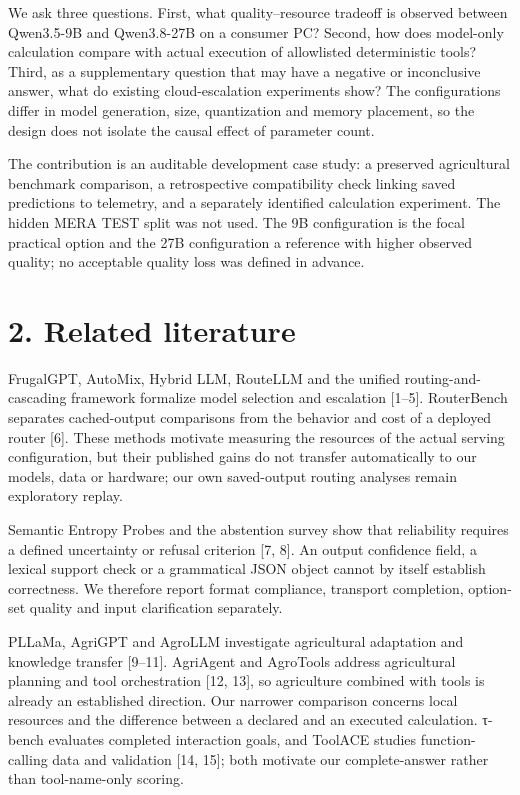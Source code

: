 \documentclass[10pt,a4paper]{article}
\begin{document}
We ask three questions. First, what quality–resource tradeoff is observed between Qwen3.5-9B and Qwen3.8-27B on a consumer PC? Second, how does model-only calculation compare with actual execution of allowlisted deterministic tools? Third, as a supplementary question that may have a negative or inconclusive answer, what do existing cloud-escalation experiments show? The configurations differ in model generation, size, quantization and memory placement, so the design does not isolate the causal effect of parameter count.

The contribution is an auditable development case study: a preserved agricultural benchmark comparison, a retrospective compatibility check linking saved predictions to telemetry, and a separately identified calculation experiment. The hidden MERA TEST split was not used. The 9B configuration is the focal practical option and the 27B configuration a reference with higher observed quality; no acceptable quality loss was defined in advance.

\section*{2. Related literature}
FrugalGPT, AutoMix, Hybrid LLM, RouteLLM and the unified routing-and-cascading framework formalize model selection and escalation [1–5]. RouterBench separates cached-output comparisons from the behavior and cost of a deployed router [6]. These methods motivate measuring the resources of the actual serving configuration, but their published gains do not transfer automatically to our models, data or hardware; our own saved-output routing analyses remain exploratory replay.

Semantic Entropy Probes and the abstention survey show that reliability requires a defined uncertainty or refusal criterion [7, 8]. An output confidence field, a lexical support check or a grammatical JSON object cannot by itself establish correctness. We therefore report format compliance, transport completion, option-set quality and input clarification separately.

PLLaMa, AgriGPT and AgroLLM investigate agricultural adaptation and knowledge transfer [9–11]. AgriAgent and AgroTools address agricultural planning and tool orchestration [12, 13], so agriculture combined with tools is already an established direction. Our narrower comparison concerns local resources and the difference between a declared and an executed calculation. τ-bench evaluates completed interaction goals, and ToolACE studies function-calling data and validation [14, 15]; both motivate our complete-answer rather than tool-name-only scoring.
\end{document}
